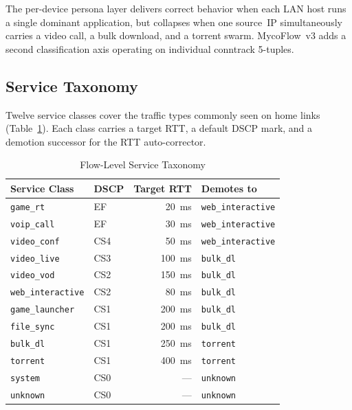 The per-device persona layer delivers correct behavior when each LAN host runs a single dominant application, but collapses when one source~IP simultaneously carries a video call, a bulk download, and a torrent swarm. MycoFlow~v3 adds a second classification axis operating on individual conntrack 5-tuples.

\subsection{Service Taxonomy}

Twelve service classes cover the traffic types commonly seen on home links (Table~\ref{tab:services}). Each class carries a target RTT, a default DSCP mark, and a demotion successor for the RTT auto-corrector.

\begin{table}[h]
\caption{Flow-Level Service Taxonomy}
\label{tab:services}
\centering
\small
{\setlength{\tabcolsep}{5pt}
\begin{tabular}{llrl}
\toprule
\textbf{Service Class} & \textbf{DSCP} & \textbf{Target RTT} & \textbf{Demotes to} \\
\midrule
\texttt{game\_rt}          & EF   & 20~ms  & \texttt{web\_interactive} \\
\texttt{voip\_call}        & EF   & 30~ms  & \texttt{web\_interactive} \\
\texttt{video\_conf}       & CS4  & 50~ms  & \texttt{web\_interactive} \\
\texttt{video\_live}       & CS3  & 100~ms & \texttt{bulk\_dl} \\
\texttt{video\_vod}        & CS2  & 150~ms & \texttt{bulk\_dl} \\
\texttt{web\_interactive}  & CS2  & 80~ms  & \texttt{bulk\_dl} \\
\texttt{game\_launcher}    & CS1  & 200~ms & \texttt{bulk\_dl} \\
\texttt{file\_sync}        & CS1  & 200~ms & \texttt{bulk\_dl} \\
\texttt{bulk\_dl}          & CS1  & 250~ms & \texttt{torrent} \\
\texttt{torrent}           & CS1  & 400~ms & \texttt{torrent} \\
\texttt{system}            & CS0  & ---    & \texttt{unknown} \\
\texttt{unknown}           & CS0  & ---    & \texttt{unknown} \\
\bottomrule
\end{tabular}}
\end{table}

